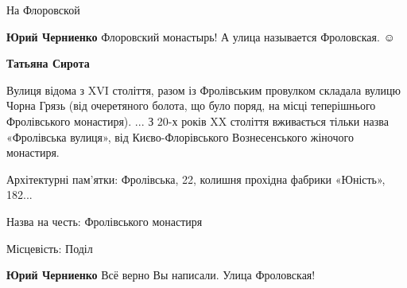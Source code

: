  
 
 
 
 


На Флоровской

\textbf{Юрий Черниенко} Флоровский монастырь!
А улица называется Фроловская. ☺ ️ 

\textbf{Татьяна Сирота} 

Вулиця відома з XVI століття, разом із Фролівським провулком складала вулицю
Чорна Грязь (від очеретяного болота, що було поряд, на місці теперішнього
Фролівського монастиря). ... З 20-х років XX століття вживається тільки назва
«Фролівська вулиця», від Києво-Флорівського Вознесенського жіночого монастиря.

Архітектурні пам'ятки: Фролівська, 22, колишня прохідна фабрики «Юність»,
182...

Назва на честь: Фролівського монастиря

Місцевість: Поділ

\textbf{Юрий Черниенко} Всё верно Вы написали.
Улица Фроловская!
